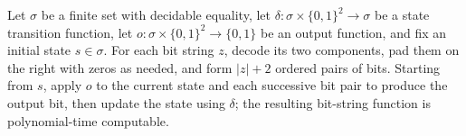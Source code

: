 \begin{theorem}
\label{Complexity.BinArith.polyTimeComputable_serial}
\leanok
{}
Let $\sigma$ be a finite set with decidable equality, let
$\delta:\sigma\times\{0,1\}^2\to\sigma$ be a state transition function, let
$o:\sigma\times\{0,1\}^2\to\{0,1\}$ be an output function, and fix an initial state
$s\in\sigma$. For each bit string $z$, decode its two components, pad them on the right
with zeros as needed, and form $|z|+2$ ordered pairs of bits. Starting from $s$, apply
$o$ to the current state and each successive bit pair to produce the output bit, then
update the state using $\delta$; the resulting bit-string function is polynomial-time
computable.
\end{theorem}
